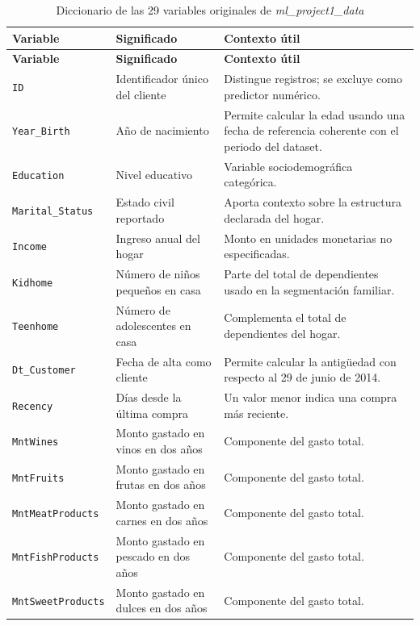 \documentclass[12pt]{article}
\begin{document}
\scriptsize
\begin{longtable}{|p{3.1cm}|p{4.6cm}|p{6.2cm}|}
\caption{Diccionario de las 29 variables originales de \textit{ml\_project1\_data}}
\label{tab:diccionario}\\
\hline
\rowcolor{escom-azul!20}
\textbf{Variable} & \textbf{Significado} & \textbf{Contexto útil} \\
\hline
\endfirsthead
\hline
\rowcolor{escom-azul!20}
\textbf{Variable} & \textbf{Significado} & \textbf{Contexto útil} \\
\hline
\endhead
\texttt{ID} & Identificador único del cliente & Distingue registros; se excluye como predictor numérico. \\
\hline
\texttt{Year\_Birth} & Año de nacimiento & Permite calcular la edad usando una fecha de referencia coherente con el periodo del dataset. \\
\hline
\texttt{Education} & Nivel educativo & Variable sociodemográfica categórica. \\
\hline
\texttt{Marital\_Status} & Estado civil reportado & Aporta contexto sobre la estructura declarada del hogar. \\
\hline
\texttt{Income} & Ingreso anual del hogar & Monto en unidades monetarias no especificadas. \\
\hline
\texttt{Kidhome} & Número de niños pequeños en casa & Parte del total de dependientes usado en la segmentación familiar. \\
\hline
\texttt{Teenhome} & Número de adolescentes en casa & Complementa el total de dependientes del hogar. \\
\hline
\texttt{Dt\_Customer} & Fecha de alta como cliente & Permite calcular la antigüedad con respecto al 29 de junio de 2014. \\
\hline
\texttt{Recency} & Días desde la última compra & Un valor menor indica una compra más reciente. \\
\hline
\texttt{MntWines} & Monto gastado en vinos en dos años & Componente del gasto total. \\
\hline
\texttt{MntFruits} & Monto gastado en frutas en dos años & Componente del gasto total. \\
\hline
\texttt{MntMeatProducts} & Monto gastado en carnes en dos años & Componente del gasto total. \\
\hline
\texttt{MntFishProducts} & Monto gastado en pescado en dos años & Componente del gasto total. \\
\hline
\texttt{MntSweetProducts} & Monto gastado en dulces en dos años & Componente del gasto total. \\

\end{longtable}
\end{document}

